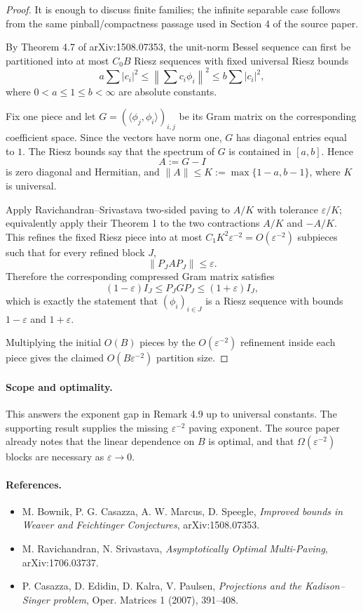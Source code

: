 \documentclass[11pt]{article}
\begin{document}
\begin{proof}
It is enough to discuss finite families; the infinite separable case follows
from the same pinball/compactness passage used in Section 4 of the source
paper.

By Theorem 4.7 of arXiv:1508.07353, the unit-norm Bessel sequence can first be
partitioned into at most $C_0 B$ Riesz sequences with fixed universal Riesz
bounds
\[
  a\sum |c_i|^2 \leq \left\|\sum c_i\phi_i\right\|^2
  \leq b\sum |c_i|^2,
\]
where $0<a\leq 1\leq b<\infty$ are absolute constants.

Fix one piece and let $G=(\langle\phi_j,\phi_i\rangle)_{i,j}$ be its Gram
matrix on the corresponding coefficient space.  Since the vectors have norm
one, $G$ has diagonal entries equal to $1$.  The Riesz bounds say that the
spectrum of $G$ is contained in $[a,b]$.  Hence
\[
  A:=G-I
\]
is zero diagonal and Hermitian, and $\|A\|\leq K:=\max\{1-a,b-1\}$, where $K$
is universal.

Apply Ravichandran--Srivastava two-sided paving to $A/K$ with tolerance
$\varepsilon/K$; equivalently apply their Theorem 1 to the two contractions
$A/K$ and $-A/K$.  This refines the fixed Riesz piece into at most
$C_1K^2\varepsilon^{-2}=O(\varepsilon^{-2})$ subpieces such that for every
refined block $J$,
\[
  \|P_J A P_J\|\leq \varepsilon .
\]
Therefore the corresponding compressed Gram matrix satisfies
\[
  (1-\varepsilon)I_J \leq P_JGP_J \leq (1+\varepsilon)I_J,
\]
which is exactly the statement that $(\phi_i)_{i\in J}$ is a Riesz sequence
with bounds $1-\varepsilon$ and $1+\varepsilon$.

Multiplying the initial $O(B)$ pieces by the $O(\varepsilon^{-2})$ refinement
inside each piece gives the claimed $O(B\varepsilon^{-2})$ partition size.
\end{proof}

\paragraph{Scope and optimality.}
This answers the exponent gap in Remark 4.9 up to universal constants.  The
supporting result supplies the missing $\varepsilon^{-2}$ paving exponent.  The
source paper already notes that the linear dependence on $B$ is optimal, and
that $\Omega(\varepsilon^{-2})$ blocks are necessary as $\varepsilon\to0$.

\paragraph{References.}
\begin{itemize}
\item M. Bownik, P. G. Casazza, A. W. Marcus, D. Speegle,
\emph{Improved bounds in Weaver and Feichtinger Conjectures},
arXiv:1508.07353.
\item M. Ravichandran, N. Srivastava,
\emph{Asymptotically Optimal Multi-Paving},
arXiv:1706.03737.
\item P. Casazza, D. Edidin, D. Kalra, V. Paulsen,
\emph{Projections and the Kadison--Singer problem},
Oper. Matrices 1 (2007), 391--408.
\end{itemize}
\end{document}
